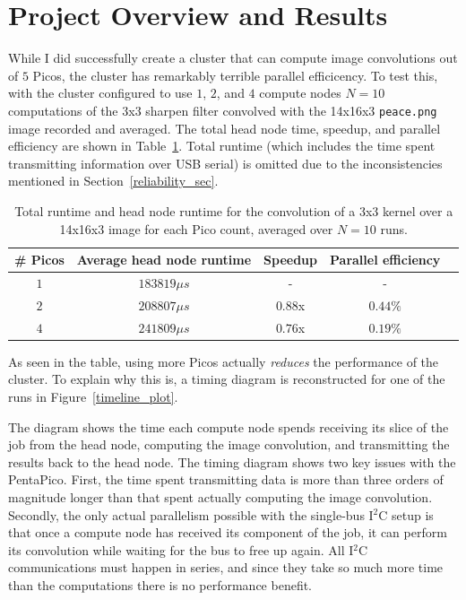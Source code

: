 \documentclass[conference]{IEEEtran}
\begin{document}
\section{Project Overview and Results}
\label{results_sec}

While I did successfully create a cluster that can compute image convolutions out of $5$ Picos, the cluster has remarkably terrible parallel efficicency.
To test this, with the cluster configured to use $1$, $2$, and $4$ compute nodes $N=10$ computations of the 3x3 sharpen filter convolved with the 14x16x3 \texttt{peace.png} image recorded and averaged.
The total head node time, speedup, and parallel efficiency are shown in Table~\ref{runtime_table}.
Total runtime (which includes the time spent transmitting information over USB serial) is omitted due to the inconsistencies mentioned in Section~\ref{reliability_sec}.

\begin{table}[tb]
\centering
\caption{Total runtime and head node runtime for the convolution of a 3x3 kernel over a 14x16x3 image for each Pico count, averaged over $N=10$ runs.}
\label{runtime_table}
\begin{tabular}{|c|c|c|c|c|}
\hline
\# Picos & Average head node runtime & Speedup & Parallel efficiency \\
\hline
\hline
$1$ & $183819\mu s$ & - & - \\
\hline
$2$ & $208807\mu s$ & $0.88$x & $0.44\%$ \\
\hline
$4$ & $241809\mu s$ & $0.76$x & $0.19\%$ \\
\hline
\end{tabular}
\end{table}

As seen in the table, using more Picos actually \textit{reduces} the performance of the cluster.
To explain why this is, a timing diagram is reconstructed for one of the runs in Figure~\ref{timeline_plot}.

The diagram shows the time each compute node spends receiving its slice of the job from the head node, computing the image convolution, and transmitting the results back to the head node.
The timing diagram shows two key issues with the PentaPico.
First, the time spent transmitting data is more than three orders of magnitude longer than that spent actually computing the image convolution.
Secondly, the only actual parallelism possible with the single-bus I$^2$C setup is that once a compute node has received its component of the job, it can perform its convolution while waiting for the bus to free up again.
All I$^2$C communications must happen in series, and since they take so much more time than the computations there is no performance benefit.
\end{document}
